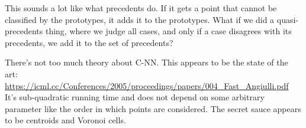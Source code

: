 \documentclass{article}
\begin{document}
This sounds a lot like what precedents do. If it gets a point that cannot be classified by the prototypes, it adds it to the prototypes.
What if we did a quasi-precedents thing, where we judge all cases, and only if a case disagrees with its precedents, we add it to the set of precedents? 

There's not too much theory about C-NN. This appears to be the state of the art:
\url{https://icml.cc/Conferences/2005/proceedings/papers/004_Fast_Angiulli.pdf}
It's sub-quadratic running time and does not depend on some arbitrary parameter like the order in which points are considered. The secret sauce appears to be centroids and Voronoi cells. 
\end{document}
